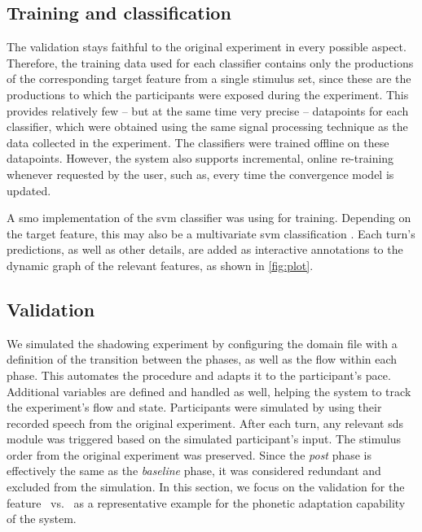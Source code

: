 \subsection{Training and classification}
\label{subsec:training_and_classification}

The validation stays faithful to the original experiment in every possible aspect.
Therefore, the training data used for each classifier contains only the productions of the corresponding target feature from a single stimulus set, since these are the productions to which the participants were exposed during the experiment.
This provides relatively few -- but at the same time very precise -- datapoints for each classifier,
which were obtained using the same signal processing technique as the data collected in the experiment.
The classifiers were trained offline on these datapoints.
However, the system also supports incremental, online re-training whenever requested by the user,
such as, every time the convergence model is updated.

A \ac{smo} \citep{Platt1999fast, Platt1998sequential} implementation of the \ac{svm} classifier \citep{Vapnik1998support} was using for training.
Depending on the target feature, this may also be a multivariate \ac{svm} classification \citep[e.g.,][]{Joachims2005support}.
Each turn's predictions, as well as other details, are added as interactive annotations to the dynamic graph of the relevant features, as shown in \cref{fig:plot}.

\subsection{Validation}
\label{subsec:validation}

We simulated the shadowing experiment by configuring the domain file with a definition of the transition between the phases, as well as the flow within each phase.
This automates the procedure and adapts it to the participant's pace.
Additional variables are defined and handled as well, helping the system to track the experiment's flow and state.
Participants were simulated by using their recorded speech from the original experiment.
After each turn, any relevant \ac{sds} module was triggered based on the simulated participant's input.
The stimulus order from the original experiment was preserved.
Since the \emph{post} phase is effectively the same as the \emph{baseline} phase, it was considered redundant and excluded from the simulation.
In this section, we focus on the validation for the feature \textipa{[E:]}~vs.~\textipa{[e:]} as a representative example for the phonetic adaptation capability of the system.

